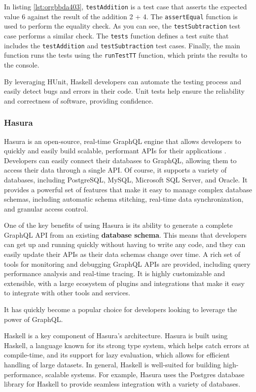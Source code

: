 \documentclass[a4paper, titlepage, twoside]{article}
\begin{document}
In listing \ref{lst:orgbbda403}, \texttt{testAddition} is a test case that asserts the expected value 6 against the result of the addition 2 + 4. The \texttt{assertEqual} function is used to perform the equality check. As you can see, the \texttt{testSubtraction} test case performs a similar check. The \texttt{tests} function defines a test suite that includes the \texttt{testAddition} and \texttt{testSubtraction} test cases. Finally, the main function runs the tests using the \texttt{runTestTT} function, which prints the results to the console.

By leveraging HUnit, Haskell developers can automate the testing process and easily detect bugs and errors in their code. Unit tests help ensure the reliability and correctness of software, providing confidence.

\subsubsection{Hasura}
\label{sec:orgd84ede9}

Hasura is an open-source, real-time GraphQL engine that allows developers to quickly and easily build scalable, performant APIs for their applications \autocite{hasuraInstantGraphQLAPIs}. Developers can easily connect their databases to GraphQL, allowing them to access their data through a single API. Of course, it supports a variety of databases, including PostgreSQL, MySQL, Microsoft SQL Server, and Oracle. It provides a powerful set of features that make it easy to manage complex database schemas, including automatic schema stitching, real-time data synchronization, and granular access control.

One of the key benefits of using Hasura is its ability to generate a complete GraphQL API from an existing \textbf{database schema}. This means that developers can get up and running quickly without having to write any code, and they can easily update their APIs as their data schemas change over time. A rich set of tools for monitoring and debugging GraphQL APIs are provided, including query performance analysis and real-time tracing. It is highly customizable and extensible, with a large ecosystem of plugins and integrations that make it easy to integrate with other tools and services.

It has quickly become a popular choice for developers looking to leverage the power of GraphQL.

Haskell is a key component of Hasura's architecture. Hasura is built using Haskell, a language known for its strong type system, which helps catch errors at compile-time, and its support for lazy evaluation, which allows for efficient handling of large datasets. In general, Haskell is well-suited for building high-performance, scalable systems. For example, Hasura uses the Postgres database library for Haskell to provide seamless integration with a variety of databases.
\end{document}
